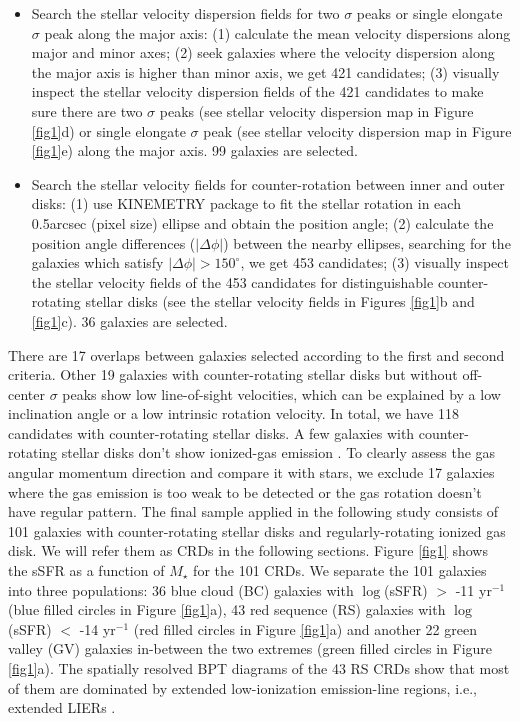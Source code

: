\documentclass{aastex631}
\begin{document}
\begin{itemize}
    \item [1.]
    Search the stellar velocity dispersion fields for two $\sigma$ peaks or single elongate $\sigma$ peak along the major axis: (1) calculate the mean velocity dispersions along major and minor axes; (2) seek galaxies where the velocity dispersion along the major axis is higher than minor axis, we get 421 candidates; (3) visually inspect the stellar velocity dispersion fields of the 421 candidates to make sure there are two $\sigma$ peaks (see stellar velocity dispersion map in Figure \ref{fig1}d) or single elongate $\sigma$ peak (see stellar velocity dispersion map in Figure \ref{fig1}e) along the major axis. 99 galaxies are selected.

    \item [2.]
    Search the stellar velocity fields for counter-rotation between inner and outer disks: (1) use KINEMETRY package \citep{2006MNRAS.366..787K} to fit the stellar rotation in each 0.5arcsec (pixel size) ellipse and obtain the position angle; (2) calculate the position angle differences ($|\Delta \phi|$) between the nearby ellipses, searching for the galaxies which satisfy $|\Delta \phi| > 150^{\circ}$, we get 453 candidates; (3) visually inspect the stellar velocity fields of the 453 candidates for distinguishable counter-rotating stellar disks (see the stellar velocity fields in Figures \ref{fig1}b and \ref{fig1}c). 36 galaxies are selected.
 
\end{itemize}

There are 17 overlaps between galaxies selected according to the first and second criteria. Other 19 galaxies with counter-rotating stellar disks but without off-center $\sigma$ peaks show low line-of-sight velocities, which can be explained by a low inclination angle \citep{2021A&A...654A..30R} or a low intrinsic rotation velocity. In total, we have 118 candidates with counter-rotating stellar disks. A few galaxies with counter-rotating stellar disks don't show ionized-gas emission \citep{2011MNRAS.414.2923K, 2016MNRAS.461.2068K}. To clearly assess the gas angular momentum direction and compare it with stars, we exclude 17 galaxies where the gas emission is too weak to be detected or the gas rotation doesn't have regular pattern. The final sample applied in the following study consists of 101 galaxies with counter-rotating stellar disks and regularly-rotating ionized gas disk. We will refer them as CRDs in the following sections. Figure \ref{fig1} shows the sSFR as a function of $M_{\star}$ for the 101 CRDs. We separate the 101 galaxies into three populations: 36 blue cloud (BC) galaxies with $\log$(sSFR) $>$ -11 yr$^{-1}$ (blue filled circles in Figure \ref{fig1}a), 43 red sequence (RS) galaxies with $\log$(sSFR) $<$ -14 yr$^{-1}$ (red filled circles in Figure \ref{fig1}a) and another 22 green valley (GV) galaxies in-between the two extremes (green filled circles in Figure \ref{fig1}a). The spatially resolved BPT diagrams \citep{2006MNRAS.372..961K} of the 43 RS CRDs show that most of them are dominated by extended low-ionization emission-line regions, i.e., extended LIERs \citep{2016MNRAS.461.3111B}.
\end{document}

